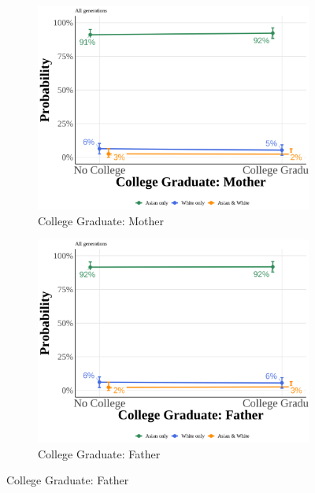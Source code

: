 \begin{center}
\begin{figure}[!htb]
\vspace{0.5cm}

\begin{subfigure}{.48\textwidth}
\caption{College Graduate: Mother}
\centering
\includegraphics[width=1\linewidth]{simple_pp_MomGradCollege_all.png}
\end{subfigure}
\hfill
\begin{subfigure}{.48\textwidth}
\caption{College Graduate: Father}
\centering
\includegraphics[width=1\linewidth]{simple_pp_DadGradCollege_all.png}
\end{subfigure}


\end{figure}
\end{center}

